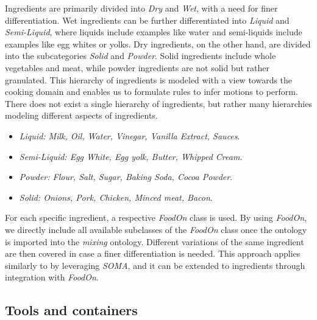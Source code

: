 Ingredients are primarily divided into \textit{Dry} and \textit{Wet}, with a need for finer differentiation.
Wet ingredients can be further differentiated into \textit{Liquid} and \textit{Semi-Liquid}, where liquids include examples like water and semi-liquids include examples like egg whites or yolks. 
Dry ingredients, on the other hand, are divided into the subcategories \textit{Solid} and \textit{Powder}. 
Solid ingredients include whole vegetables and meat, while powder ingredients are not solid but rather granulated. 
This hierarchy of ingredients is modeled with a view towards the cooking domain and enables us to formulate rules to infer motions to perform. 
There does not exist a single hierarchy of ingredients, but rather many hierarchies modeling different aspects of ingredients.

\begin{itemize}
    \item \textit{Liquid: Milk, Oil, Water, Vinegar, Vanilla Extract, Sauces}.
    \item \textit{Semi-Liquid: Egg White, Egg yolk, Butter, Whipped Cream}.
    \item \textit{Powder: Flour, Salt, Sugar, Baking Soda, Cocoa Powder}.
    \item \textit{Solid: Onions, Pork, Chicken, Minced meat, Bacon}.
  \end{itemize}

For each specific ingredient, a respective \textit{FoodOn} class is used. By using \textit{FoodOn}, we directly include all available subclasses of the 
\textit{FoodOn} class once the ontology is imported into the \textit{mixing} ontology.
Different variations of the same ingredient are then covered in case a finer differentiation is needed. This approach applies similarly to 
 by leveraging \textit{SOMA}, and it can be extended to ingredients through integration with \textit{FoodOn}.


\subsection{Tools and containers}
\label{sec:toolsandcontainers}

